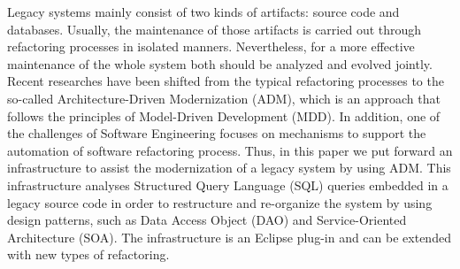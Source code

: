 Legacy systems mainly consist of two kinds of artifacts: source code and databases. Usually, the maintenance of those artifacts is carried out through refactoring processes in isolated manners. Nevertheless, for a more effective maintenance of the whole system both should be analyzed and evolved jointly. Recent researches have been shifted from the typical refactoring processes to the so-called Architecture-Driven Modernization (ADM), which is an approach that follows the principles of Model-Driven Development (MDD). In addition, one of the challenges of Software Engineering focuses on mechanisms to support the automation of software refactoring process. Thus, in this paper we put forward an infrastructure  to assist the modernization of a legacy system by using ADM.%
This infrastructure analyses Structured Query Language (SQL) queries embedded in a legacy source code in order to restructure and re-organize the system by using design patterns, such as Data Access Object (DAO) and Service-Oriented Architecture (SOA). The infrastructure is an Eclipse plug-in and can be extended with new types of refactoring.